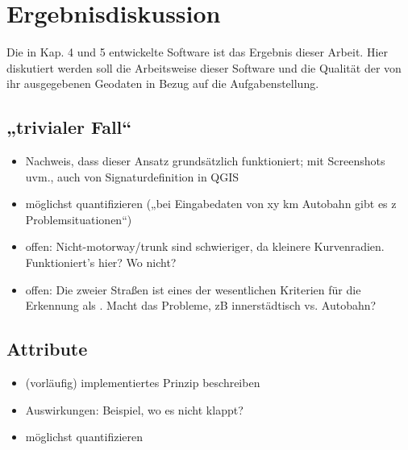 \documentclass[../main/thesis.tex]{subfiles}
\begin{document}
\chapter{Ergebnisdiskussion}

Die in Kap. 4 und 5 entwickelte Software ist das Ergebnis dieser Arbeit. Hier diskutiert werden soll die Arbeitsweise dieser Software und die Qualität der von ihr ausgegebenen Geodaten in Bezug auf die Aufgabenstellung.




\section{„trivialer Fall“}

\begin{itemize}
\item Nachweis, dass dieser Ansatz grundsätzlich funktioniert; mit Screenshots uvm., auch von Signaturdefinition in QGIS
\item möglichst quantifizieren („bei Eingabedaten von xy km Autobahn gibt es z Problemsituationen“)
\item offen: Nicht-motorway/trunk sind schwieriger, da kleinere Kurvenradien. Funktioniert's hier? Wo nicht?
\item offen: Die  zweier Straßen ist eines der wesentlichen Kriterien für die Erkennung als . Macht das Probleme, zB innerstädtisch vs. Autobahn?
\end{itemize}



\section{Attribute}

\begin{itemize}
\item (vorläufig) implementiertes Prinzip beschreiben
\item Auswirkungen: Beispiel, wo es nicht klappt?
\item möglichst quantifizieren
\end{itemize}
\end{document}
